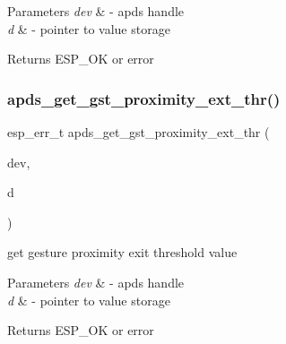 \begin{DoxyParams}{Parameters}
{\em dev} & -\/ apds handle \\
\hline
{\em d} & -\/ pointer to value storage \\
\hline
\end{DoxyParams}
\begin{DoxyReturn}{Returns}
E\+S\+P\+\_\+\+OK or error 
\end{DoxyReturn}
\mbox{\label{group__APDS9960__GestureFunctions_ga738bd08725c40599d71954e720fab391}} 
\subsubsection{\texorpdfstring{apds\+\_\+get\+\_\+gst\+\_\+proximity\+\_\+ext\+\_\+thr()}{apds\_get\_gst\_proximity\_ext\_thr()}}
{\footnotesize\ttfamily esp\+\_\+err\+\_\+t apds\+\_\+get\+\_\+gst\+\_\+proximity\+\_\+ext\+\_\+thr (\begin{DoxyParamCaption}\item[{\hyperlink{structAPDS9960__Driver}{A\+P\+D\+S\+\_\+\+D\+EV}}]{dev,  }\item[{\hyperlink{vl53l0x__types_8h_aba7bc1797add20fe3efdf37ced1182c5}{uint8\+\_\+t} $\ast$}]{d }\end{DoxyParamCaption})}




\begin{DoxyItemize}
\item get gesture proximity exit threshold value 
\end{DoxyItemize}


\begin{DoxyParams}{Parameters}
{\em dev} & -\/ apds handle \\
\hline
{\em d} & -\/ pointer to value storage \\
\hline
\end{DoxyParams}
\begin{DoxyReturn}{Returns}
E\+S\+P\+\_\+\+OK or error 
\end{DoxyReturn}
\mbox{\label{group__APDS9960__GestureFunctions_gaeeb9b0cc4c0d99da8959c6a1f1c942d8}} 
